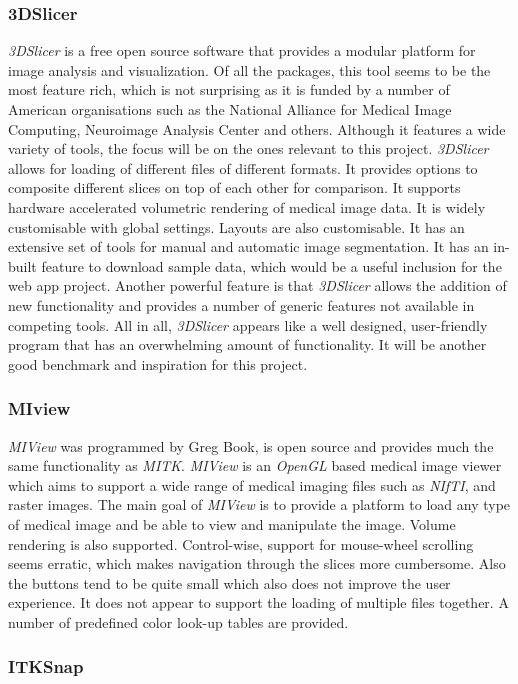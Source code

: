 \documentclass[a4paper,11pt,twoside]{article}
\begin{document}
\subsubsection{3DSlicer}
\textit{3DSlicer} is a free open source software that provides a modular platform for image analysis and visualization. Of all the packages, this tool seems to be the most feature rich, which is not surprising as it is funded by a number of American organisations such as  the National Alliance for Medical Image Computing, Neuroimage Analysis Center and others. Although it features a wide variety of tools, the focus will be on the ones relevant to this project. \textit{3DSlicer} allows for loading of different files of different formats. It provides options to composite different slices on top of each other for comparison. It supports hardware accelerated volumetric rendering of medical image data. It is widely customisable with global settings. Layouts are also customisable. It has an extensive set of tools for manual and automatic image segmentation. It has an in-built feature to download sample data, which would be a useful inclusion for the web app project. Another powerful feature is that \textit{3DSlicer} allows the addition of new functionality and provides a number of generic features not available in competing tools. All in all, \textit{3DSlicer} appears like a well designed, user-friendly program that has an overwhelming amount of functionality. It will be another good benchmark and inspiration for this project.

\subsubsection{MIview}
\textit{MIView} was programmed by Greg Book, is open source and provides much the same functionality as \textit{MITK}. \textit{MIView} is an \textit{OpenGL} based medical image viewer which aims to support a wide range of medical imaging files such as \textit{NIfTI}, and raster images. The main goal of \textit{MIView} is to provide a platform to load any type of medical image and be able to view and manipulate the image. Volume rendering is also supported. Control-wise, support for mouse-wheel scrolling seems erratic, which makes navigation through the slices more cumbersome. Also the buttons tend to be quite small which also does not improve the user experience. It does not appear to support the loading of multiple files together. A number of predefined color look-up tables are provided.


\subsubsection{ITKSnap}
\end{document}
